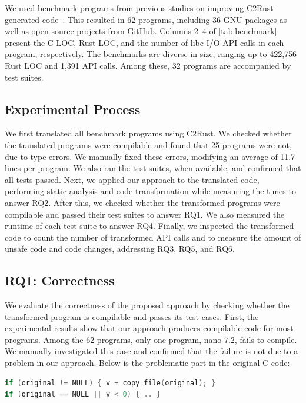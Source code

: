 We used benchmark programs from previous studies on improving C2Rust-generated
code~\cite{zhang2023ownership, hong2024dont, hong2024tag}.
%
This resulted in 62 programs, including 36 GNU packages as well as open-source
projects from GitHub.
%
Columns 2--4 of \cref{tab:benchmark} present the C LOC, Rust LOC, and the number
of libc I/O API calls in each program, respectively.
%
The benchmarks are diverse in size, ranging up to 422,756 Rust LOC and 1,391 API
calls.
%
Among these, 32 programs are accompanied by test suites.

\subsection{Experimental Process}
\label{sec:evaluation:process}

We first translated all benchmark programs using C2Rust.
%
We checked whether the translated programs were compilable and found that 25
programs were not, due to type errors.
%
We manually fixed these errors, modifying an average of 11.7 lines per program.
%
We also ran the test suites, when available, and confirmed that all tests
passed.
%
Next, we applied our approach to the translated code, performing static analysis
and code transformation while measuring the times to answer RQ2.
%
After this, we checked whether the transformed programs were compilable and
passed their test suites to answer RQ1.
%
We also measured the runtime of each test suite to answer RQ4.
%
Finally, we inspected the transformed code to count the number of transformed
API calls and to measure the amount of unsafe code and code changes, addressing
RQ3, RQ5, and RQ6.

\subsection{RQ1: Correctness}
\label{sec:evaluation:correctness}

We evaluate the correctness of the proposed approach by checking whether the
transformed program is compilable and passes its test cases.
%
First, the experimental results show that our approach produces compilable code
for most programs.
%
Among the 62 programs, only one program, nano-7.2, fails to compile.
%
We manually investigated this case and confirmed that the failure is not due to
a problem in our approach.
%
Below is the problematic part in the original C code:

\begin{lstlisting}[language=C]
if (original != NULL) { v = copy_file(original); }
if (original == NULL || v < 0) { .. }
\end{lstlisting}

